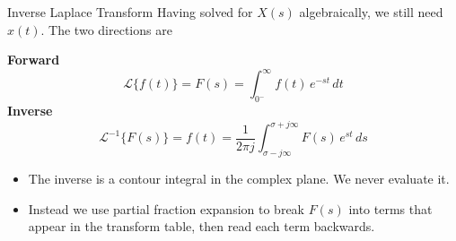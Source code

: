 \documentclass[12pt, aspectratio=169]{beamer}
\begin{document}
\begin{frame}{Inverse Laplace Transform}
    Having solved for $X(s)$ algebraically, we still need $x(t)$. The two directions are
    \begin{center}
        \textbf{Forward}
        \[
            \boxed{\mathcal{L}\{f(t)\} = F(s) = \int_{0^-}^{\infty}\! f(t)\,e^{-st}\,dt}
        \]
        \newline
        \textbf{Inverse}
        \[
            \boxed{\mathcal{L}^{-1}\{F(s)\} = f(t)
            = \frac{1}{2\pi j}\int_{\sigma - j\infty}^{\sigma + j\infty}\! F(s)\,e^{st}\,ds
            }
        \]
    \end{center}
    \begin{itemize}
        \item The inverse is a contour integral in the complex plane. \alert{We never evaluate it.} 
        \item Instead we use \alert{partial fraction expansion} to break $F(s)$ into terms that appear in the transform table, then read each
              term backwards.
    \end{itemize}
\end{frame}

\end{document}
